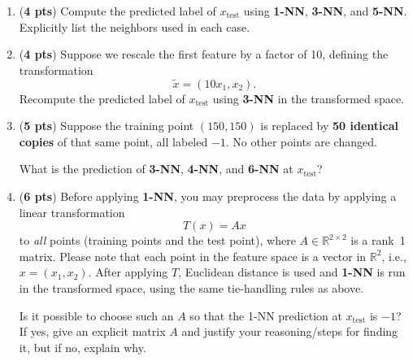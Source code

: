 \documentclass{article}
\begin{document}
\begin{enumerate}
\item[(a)] ({\bf 4 pts})
Compute the predicted label of \(x_{\text{test}}\) using \textbf{1-NN}, \textbf{3-NN}, and \textbf{5-NN}.
Explicitly list the neighbors used in each case.

\begin{tcolorbox}[breakable,enhanced,notitle,width=16.6cm,height=6cm]

\end{tcolorbox}

\newpage
\item[(b)] ({\bf 4 pts})
Suppose we rescale the first feature by a factor of 10, defining the transformation
\[
\tilde{x} = (10x_1, x_2).
\]
Recompute the predicted label of \(x_{\text{test}}\) using \textbf{3-NN} in the transformed space.

\begin{tcolorbox}[breakable,enhanced,notitle,width=16.6cm,height=6cm]

\end{tcolorbox}

\item[(c)] ({\bf 5 pts})
Suppose the training point \((150,150)\) is replaced by \textbf{50 identical copies} of that same point, all labeled \(-1\).
No other points are changed.

What is the prediction of \textbf{3-NN}, \textbf{4-NN}, and \textbf{6-NN} at \(x_{\text{test}}\)?

\begin{tcolorbox}[breakable,enhanced,notitle,width=16.6cm,height=6cm]

\end{tcolorbox}

\newpage
\item[(d)] ({\bf 6 pts})
Before applying \textbf{1-NN}, you may preprocess the data by applying a linear transformation
\[
T(x) = Ax
\]
to \emph{all} points (training points and the test point), where
\(A \in \mathbb{R}^{2\times 2}\) is a rank~1 matrix.
Please note that each point in the feature space is a vector in \(\mathbb{R}^2\), i.e., \(x = (x_1, x_2)\).
After applying \(T\), Euclidean distance is used and \textbf{1-NN} is run in the transformed space, using the same tie-handling rules as above.

Is it possible to choose such an \(A\) so that the 1-NN prediction at \(x_{\text{test}}\) is \(-1\)?
If yes, give an explicit matrix \(A\) and justify your reasoning/steps for finding it, but if no, explain why.


\end{enumerate}
\end{document}
